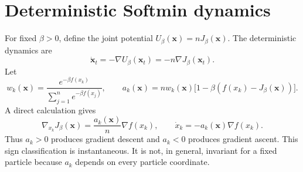 \documentclass{article}
\theoremstyle{plain}
\theoremstyle{definition}
\theoremstyle{remark}
\begin{document}


\section{Deterministic Softmin dynamics}
\label{sec:gradient-flow-dynamics}

For fixed \(\beta>0\), define the joint potential \(U_\beta(\mathbf{x})=nJ_\beta(\mathbf{x})\).  The deterministic dynamics are
\begin{equation}
    \dot{\mathbf{x}}_t=-\nabla U_\beta(\mathbf{x}_t)=-n\nabla J_\beta(\mathbf{x}_t).
    \label{eq:gradient-flow}
\end{equation}
Let
\[
 w_k(\mathbf{x})=\frac{e^{-\beta f(x_k)}}{\sum_{j=1}^n e^{-\beta f(x_j)}},
 \qquad
 a_k(\mathbf{x})=n w_k(\mathbf{x})\bigl[1-\beta(f(x_k)-J_\beta(\mathbf{x}))\bigr].
\]
A direct calculation gives
\begin{equation}
 \nabla_{x_k}J_\beta(\mathbf{x})=\frac{a_k(\mathbf{x})}{n}\nabla f(x_k),
 \qquad
 \dot x_k=-a_k(\mathbf{x})\nabla f(x_k).
 \label{eq:softmin-gradient}
\end{equation}
Thus \(a_k>0\) produces gradient descent and \(a_k<0\) produces gradient ascent.  This sign classification is instantaneous.  It is not, in general, invariant for a fixed particle because \(a_k\) depends on every particle coordinate.
\end{document}
